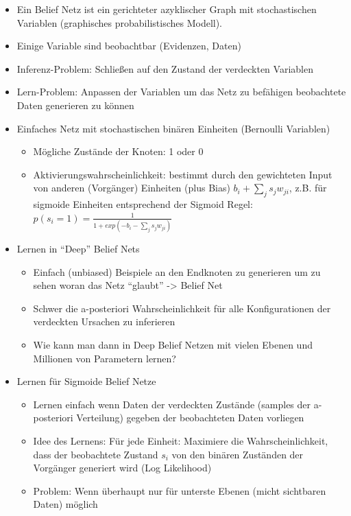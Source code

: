 \documentclass[paper=a4, fontsize=11pt]{scrartcl} %
\numberwithin{equation}{section} %
\numberwithin{figure}{section} %
\numberwithin{table}{section} %
\begin{document}
\begin{itemize}
\item Ein Belief Netz ist ein gerichteter azyklischer Graph mit stochastischen Variablen (graphisches probabilistisches Modell).
\item Einige Variable sind beobachtbar (Evidenzen, Daten)
\item Inferenz-Problem: Schließen auf den Zustand der verdeckten Variablen
\item Lern-Problem: Anpassen der Variablen um das Netz zu befähigen beobachtete Daten generieren zu können
\item Einfaches Netz mit stochastischen binären Einheiten (Bernoulli Variablen)
\begin{itemize}
\item Mögliche Zustände der Knoten: 1 oder 0
\item Aktivierungswahrscheinlichkeit: bestimmt durch den gewichteten Input von anderen (Vorgänger) Einheiten (plus Bias) $b_i + \sum\limits_j s_j w_{ji}$, z.B. für sigmoide Einheiten entsprechend der Sigmoid Regel: $p(s_i = 1) = \frac{1}{1+exp(-b_i - \sum\limits_j s_j w_{ji})}$
\end{itemize}
\item Lernen in ``Deep'' Belief Nets
\begin{itemize}
\item Einfach (unbiased) Beispiele an den Endknoten zu generieren um zu sehen woran das Netz ``glaubt'' -> Belief Net
\item Schwer die a-posteriori Wahrscheinlichkeit für alle Konfigurationen der verdeckten Ursachen zu inferieren
\item Wie kann man dann in Deep Belief Netzen mit vielen Ebenen und Millionen von Parametern lernen?
\end{itemize}
\item Lernen für Sigmoide Belief Netze
\begin{itemize}
\item Lernen einfach wenn Daten der verdeckten Zustände (samples der a-posteriori Verteilung) gegeben der beobachteten Daten vorliegen
\item Idee des Lernens: Für jede Einheit: Maximiere die Wahrscheinlichkeit, dass der beobachtete Zustand $s_i$ von den binären Zuständen der Vorgänger generiert wird (Log Likelihood)
\item Problem: Wenn überhaupt nur für unterste Ebenen (micht sichtbaren Daten) möglich
\end{itemize}
\end{itemize}
\end{document}
